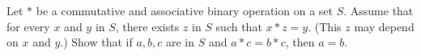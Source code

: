 Let $*$ be a commutative and associative binary operation on a set $S$. Assume that for every $x$ and $y$ in $S$, there exists $z$ in $S$ such that $x*z=y$. (This $z$ may depend on $x$ and $y$.) Show that if $a,b,c$ are in $S$ and $a*c=b*c$, then $a=b$.